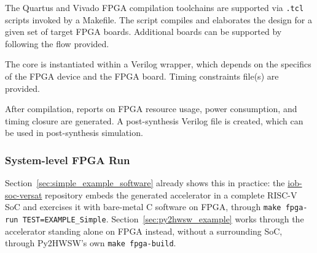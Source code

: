%

The Quartus and Vivado FPGA compilation toolchains are supported via \texttt{.tcl}
scripts invoked by a Makefile. The script compiles and elaborates the design for
a given set of target FPGA boards. Additional boards can be supported by
following the flow provided.

The core is instantiated within a Verilog wrapper, which depends on the
specifics of the FPGA device and the FPGA board. Timing constraints file(s) are
provided.

After compilation, reports on FPGA resource usage, power consumption, and timing
closure are generated. A post-synthesis Verilog file is created, which can be
used in post-synthesis simulation.



\subsubsection*{System-level FPGA Run}

Section~\ref{sec:simple_example_software} already shows this in practice: the \href{https://github.com/IObundle/iob-soc-versat}{iob-soc-versat} repository embeds the generated accelerator in a complete RISC-V SoC and exercises it with bare-metal C software on FPGA, through \texttt{make fpga-run TEST=EXAMPLE\_Simple}. Section~\ref{sec:py2hwsw_example} works through the accelerator standing alone on FPGA instead, without a surrounding SoC, through Py2HWSW's own \texttt{make fpga-build}.
